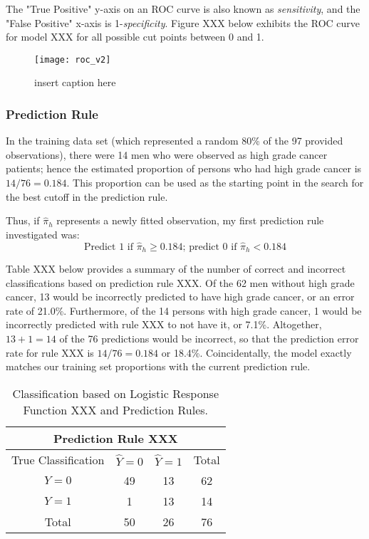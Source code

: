 The "True Positive" y-axis on an ROC curve is also known as \textit{sensitivity}, and the "False Positive" x-axis is 1-\textit{specificity}. Figure XXX below exhibits the ROC curve for model XXX for all possible cut points between 0 and 1.

\begin{figure}[H]
	\centering
	\texttt{[image: roc\_v2]}
	\caption{insert caption here}
\end{figure}

\subsubsection{Prediction Rule}
In the training data set (which represented a random 80\% of the 97 provided observations), there were 14 men who were observed as high grade cancer patients; hence the estimated proportion of persons who had high grade cancer is \(14/76=0.184\). This proportion can be used as the starting point in the search for the best cutoff in the prediction rule. \par

Thus, if \(\hat{\pi}_h\) represents a newly fitted observation, my first prediction rule investigated was:
\begin{equation}
	\textrm{Predict 1 if } \hat{\pi}_h \geq 0.184\textrm{; predict 0 if } \hat{\pi}_h < 0.184
\end{equation}

Table XXX below provides a summary of the number of correct and incorrect classifications based on prediction rule XXX. Of the 62 men without high grade cancer, 13 would be incorrectly predicted to have high grade cancer, or an error rate of 21.0\%. Furthermore, of the 14 persons with high grade cancer, 1 would be incorrectly predicted with rule XXX to not have it, or 7.1\%. Altogether, \(13+1=14\) of the 76 predictions would be incorrect, so that the prediction error rate for rule XXX is \(14/76=0.184\) or 18.4\%. Coincidentally, the model exactly matches our training set proportions with the current prediction rule. \par


\begin{table}[H]
	\centering
	\begin{tabular}{ |c||c|c||c|  }
 	\hline
 	\multicolumn{4}{|c|}{Prediction Rule XXX} \\
 	\hline\hline
 	True Classification&\(\hat{Y}=0\)&\(\hat{Y}=1\)&Total\\
 	\hline
 	\(Y=0\)&49&13&62\\
 	\(Y=1\)&1&13&14\\
 	\hline\hline
 	Total&50&26&76\\
 	\hline
	\end{tabular}
 	\caption{Classification based on Logistic Response Function XXX and Prediction Rules.}
\end{table}

